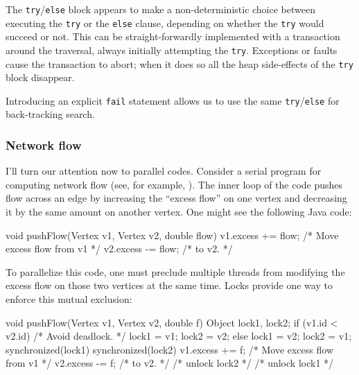 The {\tt try}/{\tt else} block appears to make a non-deterministic
choice between executing the {\tt try} or the {\tt else} clause,
depending on whether the {\tt try} would succeed or not.
This can be straight-forwardly implemented
with a transaction around the traversal,
always initially attempting
the {\tt try}.  Exceptions or faults cause the transaction to abort;
when it does so all the
heap side-effects of the {\tt try} block disappear.

Introducing an explicit {\tt fail} statement allows us to use the same
{\tt try}/{\tt else} for back-tracking search.

\subsubsection{Network flow}\label{sec:flow}

I'll turn our attention now to parallel codes.
Consider a serial program for computing network flow (see, for
example, \cite[Chapter 26]{CormenLeRi01}).  The inner loop of the code
pushes flow across an edge by increasing the ``excess flow'' on one
vertex and decreasing it by the same amount on another vertex.  One
might see the following Java code:
\begin{inlinecode}
void pushFlow(Vertex v1, Vertex v2, double flow) {
  v1.excess += flow; /* Move excess flow from v1 */
  v2.excess -= flow; /* to v2.                   */
}
\end{inlinecode}

To parallelize this code, one must preclude multiple threads from
modifying the excess flow on those two vertices at the same time.
Locks provide one way to enforce this mutual exclusion: 
\begin{inlinecode}
void pushFlow(Vertex v1, Vertex v2, double f) {
  Object lock1, lock2;
  if (v1.id < v2.id) {       /* Avoid deadlock. */
    lock1 = v1; lock2 = v2;
  } else {
    lock1 = v2; lock2 = v1;
  }
  synchronized(lock1) {
    synchronized(lock2) {
      v1.excess += f; /* Move excess flow from v1 */
      v2.excess -= f; /* to v2.                   */
    } /* unlock lock2 */
  } /* unlock lock1 */
}
\end{inlinecode}

